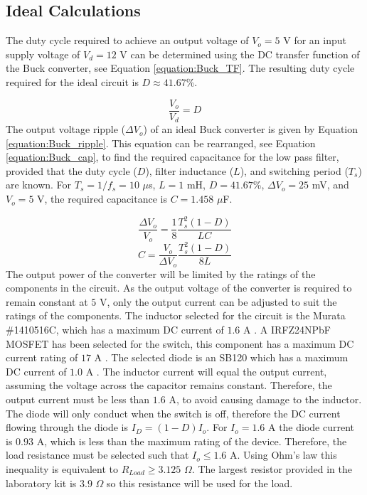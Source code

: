 \documentclass[12pt,twoside]{scrartcl}
\begin{document}
\subsection{Ideal Calculations}
The duty cycle required to achieve an output voltage of $V_{o} = 5$ V for an input supply voltage of $V_{d} = 12$ V can be determined using the DC transfer function of the Buck converter, see Equation \ref{equation:Buck_TF}. The resulting duty cycle required for the ideal circuit is $D \approx 41.67$\%.\par
\begin{equation}
\frac{V_o}{V_d} = D \label{equation:Buck_TF}
\end{equation}
The output voltage ripple ($\Delta V_o$) of an ideal Buck converter is given by Equation \ref{equation:Buck_ripple}. This equation can be rearranged, see Equation \ref{equation:Buck_cap}, to find the required capacitance for the low pass filter, provided that the duty cycle ($D$), filter inductance ($L$), and switching period ($T_{s}$) are known. For $T_{s} = 1/f_{s} = 10$ $\mu$s, $L = 1$ mH, $D = 41.67$\%, $\Delta V_{o} = 25$ mV, and $V_o = 5$ V, the required capacitance is $C = 1.458$ $\mu$F. \par
\begin{equation}
\frac{\Delta V_{o}}{V_{o}} = \frac{1}{8}\frac{T_{s}^{2}(1-D)}{LC} \label{equation:Buck_ripple}
\end{equation}
\begin{equation}
C = \frac{V_o}{\Delta V_{o}}\frac{T_{s}^{2}(1-D)}{8L} \label{equation:Buck_cap}
\end{equation}
The output power of the converter will be limited by the ratings of the components in the circuit. As the output voltage of the converter is required to remain constant at $5$ V, only the output current can be adjusted to suit the ratings of the components. The inductor selected for the circuit is the Murata \#1410516C, which has a maximum DC current of $1.6$ A \cite{RNX0}. A IRFZ24NPbF MOSFET has been selected for the switch, this component has a maximum DC current rating of $17$ A \cite{RNX1}. The selected diode is an SB120 which has a maximum DC current of $1.0$ A \cite{RNX2}. The inductor current will equal the output current, assuming the voltage across the capacitor remains constant. Therefore, the output current must be less than $1.6$ A, to avoid causing damage to the inductor. The diode will only conduct when the switch is off, therefore the DC current flowing through the diode is $I_{D} = (1-D)I_{o}$. For $I_{o} = 1.6$ A the diode current is $0.93$ A, which is less than the maximum rating of the device. Therefore, the load resistance must be selected such that $I_{o} \le 1.6$ A. Using Ohm’s law this inequality is equivalent to $R_{Load} \ge 3.125$ $\Omega$. The largest resistor provided in the laboratory kit is $3.9$ $\Omega$ so this resistance will be used for the load.\par
\end{document}
